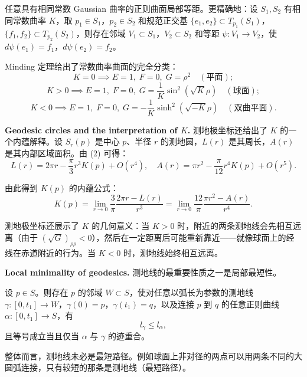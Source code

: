 \begin{Theorem}[Minding 定理]\label{minding}
任意具有相同常数 Gaussian 曲率的正则曲面局部等距。更精确地：设 $S_1, S_2$ 有相同常数曲率 $K$，取 $p_1 \in S_1$，$p_2 \in S_2$ 和规范正交基 $\{e_1,e_2\} \subset T_{p_1}(S_1)$，$\{f_1,f_2\} \subset T_{p_2}(S_2)$，则存在邻域 $V_1 \subset S_1$，$V_2 \subset S_2$ 和等距 $\psi: V_1 \to V_2$，使 $d\psi(e_1) = f_1$，$d\psi(e_2) = f_2$。
\end{Theorem}

\begin{Remark}
Minding 定理给出了常数曲率曲面的完全分类：
\[
K = 0 \implies E=1,\; F=0,\; G=\rho^2\quad (\text{平面});
\]
\[
K > 0 \implies E=1,\; F=0,\; G=\frac{1}{K}\sin^2(\sqrt{K}\rho)\quad (\text{球面});
\]
\[
K < 0 \implies E=1,\; F=0,\; G=-\frac{1}{K}\sinh^2(\sqrt{-K}\rho)\quad (\text{双曲平面}).
\]
\end{Remark}

\textbf{Geodesic circles and the interpretation of $K$.} 测地极坐标还给出了 $K$ 的一个内蕴解释。设 $S_r(p)$ 是中心 $p$、半径 $r$ 的测地圆，$L(r)$ 是其周长，$A(r)$ 是其内部区域面积。由 (2) 可得：
\[
L(r) = 2\pi r - \frac{\pi}{3}r^3 K(p) + O(r^4),\quad
A(r) = \pi r^2 - \frac{\pi}{12}r^4 K(p) + O(r^5).
\]

由此得到 $K(p)$ 的内蕴公式：
\[
K(p) = \lim_{r\to 0} \frac{3}{\pi}\frac{2\pi r - L(r)}{r^3}
= \lim_{r\to 0} \frac{12}{\pi}\frac{\pi r^2 - A(r)}{r^4}.
\]

\begin{Remark}
测地极坐标还展示了 $K$ 的几何意义：当 $K>0$ 时，附近的两条测地线会先相互远离（由于 $(\sqrt{G})_{\rho\rho}<0$），然后在一定距离后可能重新靠近——就像球面上的经线在赤道附近的行为。当 $K<0$ 时，测地线始终相互远离。
\end{Remark}

\textbf{Local minimality of geodesics.} 测地线的最重要性质之一是局部最短性。

\begin{Proposition}[测地线的局部最短性]\label{prop:geodesic-minimal}
设 $p \in S$。则存在 $p$ 的邻域 $W \subset S$，使对任意以弧长为参数的测地线 $\gamma: [0,t_1] \to W$，$\gamma(0)=p$，$\gamma(t_1)=q$，以及连接 $p$ 到 $q$ 的任意正则曲线 $\alpha: [0,t_1] \to S$，有
\[
l_\gamma \leqslant l_\alpha,
\]
且等号成立当且仅当 $\alpha$ 与 $\gamma$ 的迹重合。
\end{Proposition}

\begin{Remark}
整体而言，测地线未必是最短路径。例如球面上非对径的两点可以用两条不同的大圆弧连接，只有较短的那条是测地线（最短路径）。
\end{Remark}

